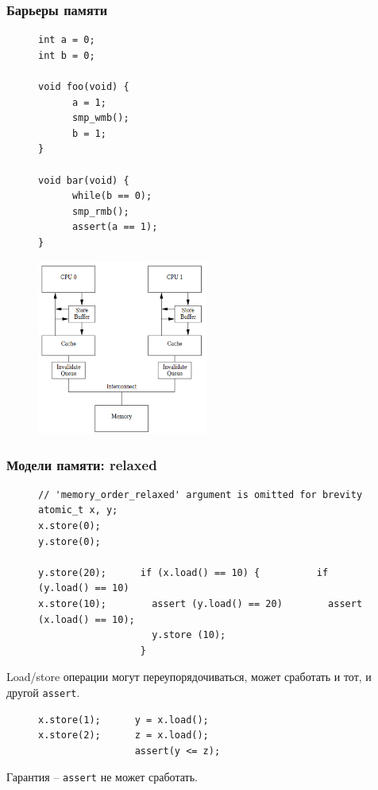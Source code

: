 \documentclass[aspectratio=169, pdf, 8pt, unicode]{beamer}
\begin{document}
\begin{frame}[fragile]
\frametitle{Барьеры памяти}
\hspace{0.05\textwidth}
\begin{minipage}{0.2\textwidth}
\begin{figure}[H]
\centering
\begin{BVerbatim}
int a = 0;
int b = 0;

void foo(void) {
      a = 1;
      smp_wmb();
      b = 1;
}

void bar(void) {
      while(b == 0);
      smp_rmb();
      assert(a == 1);
}
\end{BVerbatim}
\end{figure}
\end{minipage}
\begin{minipage}{0.7\textwidth}
\begin{figure}[H]
      \includegraphics[width=0.5\textwidth]{fig/store_buffers.png}
\end{figure}
\end{minipage}
\end{frame}

\begin{frame}[fragile]
\frametitle{Модели памяти: relaxed}
\begin{figure}[H]
\begin{BVerbatim}
// 'memory_order_relaxed' argument is omitted for brevity
atomic_t x, y;
x.store(0);
y.store(0);

y.store(20);      if (x.load() == 10) {          if (y.load() == 10)
x.store(10);        assert (y.load() == 20)        assert (x.load() == 10);
                    y.store (10);
                  }
\end{BVerbatim}
\end{figure}
Load/store операции могут переупорядочиваться, может сработать и тот, и другой \texttt{assert}.
\begin{figure}[H]
\begin{BVerbatim}
x.store(1);      y = x.load();
x.store(2);      z = x.load();
                 assert(y <= z);
\end{BVerbatim}
\end{figure}
Гарантия -- \texttt{assert} не может сработать.
\end{frame}
\end{document}
